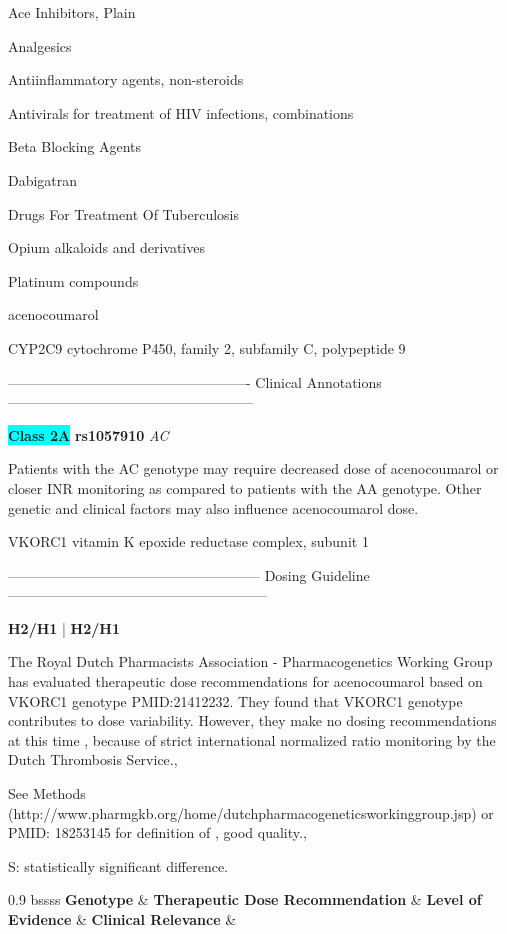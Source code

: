 \documentclass{resume} %
\begin{document}
\begin{rSection}{ Ace Inhibitors, Plain }
\begin{rSection}{ Analgesics }
\begin{rSection}{ Antiinflammatory agents, non-steroids }
\begin{rSection}{ Antivirals for treatment of HIV infections, combinations }
\begin{rSection}{ Beta Blocking Agents }
\begin{rSection}{ Dabigatran }
\begin{rSection}{ Drugs For Treatment Of Tuberculosis }
\begin{rSection}{ Opium alkaloids and derivatives }
\begin{rSection}{ Platinum compounds }
\begin{rSection}{ acenocoumarol }
\begin{rSubsection}{ CYP2C9 }{ cytochrome P450, family 2, subfamily C, polypeptide 9 }{}{}
\item[] ---------------------------------------------------- Clinical Annotations -----------------------------------------------------\newline
\item \textbf{\colorbox{cyan} {Class 2A}} \textbf{ rs1057910 } \textit{ AC }
\item[] Patients with the AC genotype may require decreased dose of acenocoumarol or closer INR monitoring as compared to patients with the AA genotype. Other genetic and clinical factors may also influence acenocoumarol dose.
\end{rSubsection}
\end{rSection}\begin{rSubsection}{ VKORC1 }{ vitamin K epoxide reductase complex, subunit 1 }{}{}
\item[]
\item[] ------------------------------------------------------ Dosing Guideline --------------------------------------------------------\newline
\item[]
\item[] \textbf{ H2/H1 } | \textbf{ H2/H1 }
\item The Royal Dutch Pharmacists Association - Pharmacogenetics Working Group has evaluated therapeutic dose recommendations for acenocoumarol based on VKORC1 genotype PMID:21412232.  They found that VKORC1 genotype contributes to dose variability.  However, they make no dosing recommendations at this time , because of strict international normalized ratio monitoring by the Dutch Thrombosis Service., 
 \newline
\item *See Methods (http://www.pharmgkb.org/home/dutchpharmacogeneticsworkinggroup.jsp) or PMID: 18253145 for definition of , good quality., 
 \newline
\item S: statistically significant difference. \newline
\vspace{1pt}\newline
		\scriptsize
		\begin{center}
		\begin{tabularx}{0.9\textwidth}{ bssss }
		\textbf{ Genotype }&\textbf{ Therapeutic Dose Recommendation }&\textbf{ Level of Evidence }&\textbf{ Clinical Relevance }&\textbf{
}\\
		\vspace{1pt}\\

\end{tabularx}
\end{center}
\end{rSubsection}
\end{rSection}
\end{rSection}
\end{rSection}
\end{rSection}
\end{rSection}
\end{rSection}
\end{rSection}
\end{rSection}
\end{rSection}
\end{document}

